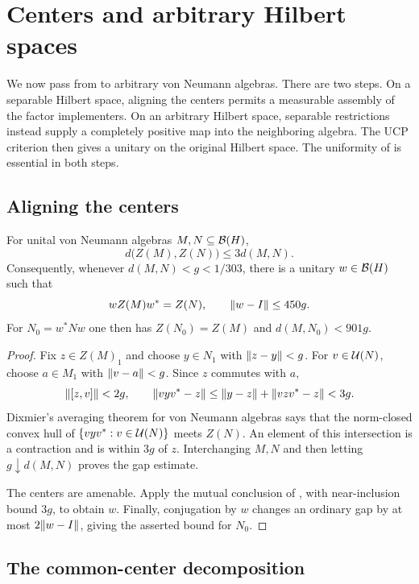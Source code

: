 \section{Centers and arbitrary Hilbert spaces}\label{sec:reductions}

We now pass from  to arbitrary von Neumann
algebras.  There are two steps.  On a separable Hilbert space, aligning
the centers permits a measurable assembly of the factor implementers.
On an arbitrary Hilbert space, separable restrictions instead supply
a completely positive map into the neighboring algebra.  The UCP
criterion then gives a unitary on the original Hilbert space.
The uniformity of  is essential in both steps.

\subsection{Aligning the centers}

\begin{lemma}\label{lem:centers-close}
For unital von Neumann algebras $M,N\subseteq\mathcal B(H)$,
\[
 d\bigl(Z(M),Z(N)\bigr)\leq 3d(M,N).
\]
Consequently, whenever $d(M,N)<g<1/303$, there is a unitary
$w\in\mathcal B(H)$ such that
\[
 wZ(M)w^*=Z(N),\qquad \lVert w-I\rVert\leq450g.
\]
For $N_0=w^*Nw$ one then has $Z(N_0)=Z(M)$ and
$d(M,N_0)<901g$.
\end{lemma}

\begin{proof}
Fix $z\in Z(M)_1$ and choose $y\in N_1$ with
$\lVert z-y\rVert<g$.  For $v\in\mathcal U(N)$, choose $a\in M_1$ with
$\lVert v-a\rVert<g$.  Since $z$ commutes with $a$,
\[
 \lVert[z,v]\rVert<2g,
 \qquad
 \lVert vyv^*-z\rVert
 \leq\lVert y-z\rVert+\lVert v z v^*-z\rVert<3g.
\]
Dixmier's averaging theorem for von Neumann algebras
\cite[Definition~III.2.5.16 and Theorem~III.2.5.18]{BlackadarOperatorAlgebras}
says that the
norm-closed convex hull of $\{vyv^*:v\in\mathcal U(N)\}$ meets $Z(N)$.
An element of this intersection is a contraction and is within $3g$
of $z$.  Interchanging $M,N$ and then letting $g\downarrow d(M,N)$
proves the gap estimate.

The centers are amenable.  Apply the mutual conclusion of
, with near-inclusion bound $3g$, to obtain $w$.
Finally, conjugation by $w$ changes an ordinary gap by at most
$2\lVert w-I\rVert$, giving the asserted bound for $N_0$.
\end{proof}

\subsection{The common-center decomposition}

